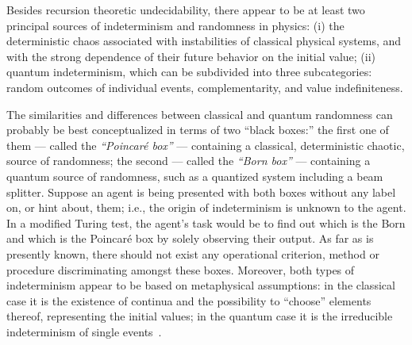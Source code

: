 \documentclass[rmp,amsfonts,showpacs,showkeys,twocolumn]{revtex4}
\begin{document}
Besides recursion theoretic undecidability,
there appear to be at least two principal sources of indeterminism and randomness in physics:
(i) the deterministic chaos associated with instabilities of classical physical systems,
and with the strong dependence of their future behavior on the initial value;
(ii) quantum indeterminism, which can be subdivided into three subcategories:  random outcomes of individual events,
 complementarity, and
value indefiniteness.

The similarities and differences between classical and quantum randomness can probably be best conceptualized
in terms of two ``black boxes:'' the first one of them --- called the {\em ``Poincar{\'e} box''} ---
containing a classical, deterministic chaotic, source of randomness;
the second  --- called the {\em ``Born box''} ---
containing a quantum source of randomness, such as a quantized system including a beam splitter.
Suppose an agent is being presented with both boxes without any label on, or hint about, them;
i.e., the origin of indeterminism
is unknown to the agent.
In a modified Turing test, the agent's task would be to find out which is the Born and which is
the Poincar{\'e} box by solely observing their output.
As far as is presently known, there should not exist any operational criterion, method or procedure
discriminating amongst these boxes.
Moreover, both types of indeterminism appear to be based on metaphysical assumptions:
in the classical case it is the existence of continua and the possibility to ``choose''
elements thereof, representing the initial values;
in the quantum case it is the irreducible indeterminism of single events~\cite{zeil-05_nature_ofQuantum}.



\end{document}
